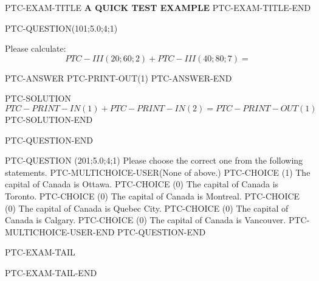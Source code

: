\documentclass[12pt]{article}
\begin{document}
PTC-EXAM-TITLE
{\LARGE {\textbf{ A QUICK TEST EXAMPLE}}}
PTC-EXAM-TITLE-END




PTC-QUESTION(101;5.0;4;1)

Please calculate: 
\begin{equation}
PTC-III (20; 60; 2) + PTC-III (40; 80; 7) = \nonumber 
\end{equation}

PTC-ANSWER
   PTC-PRINT-OUT(1)
PTC-ANSWER-END

PTC-SOLUTION
$PTC-PRINT-IN(1) + PTC-PRINT-IN(2)=  PTC-PRINT-OUT(1)$
PTC-SOLUTION-END

PTC-QUESTION-END




PTC-QUESTION  (201;5.0;4;1)
Please choose the correct one from the following statements.
PTC-MULTICHOICE-USER(None of above.)
   PTC-CHOICE (1) The capital of Canada is Ottawa.
   PTC-CHOICE (0) The capital of Canada is Toronto.
   PTC-CHOICE (0) The capital of Canada is Montreal. 
   PTC-CHOICE (0) The capital of Canada is Quebec City.
   PTC-CHOICE (0) The capital of Canada is Calgary.
   PTC-CHOICE (0) The capital of Canada is Vancouver.
PTC-MULTICHOICE-USER-END
PTC-QUESTION-END




PTC-EXAM-TAIL

PTC-EXAM-TAIL-END
\end{document}

